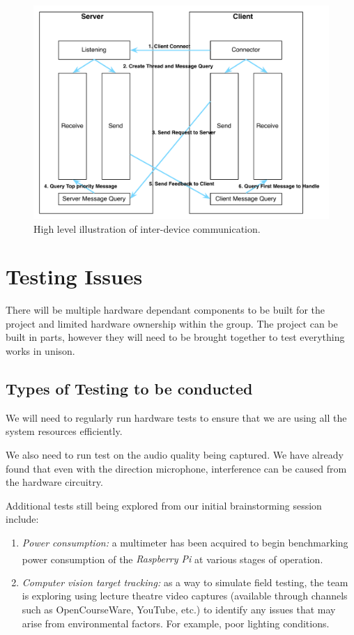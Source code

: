 \documentclass[11pt,a4paper,titlepage]{report}
\newcommand{\rpi}{\textit{Raspberry Pi\textsuperscript{\textregistered}}}
\begin{document}
\begin{figure}
\centering
\includegraphics[width=1.0\textwidth]{graphs/comm.pdf}
\caption{High level illustration of inter-device communication.}
\label{fig:comm}
\end{figure}


\section{Testing Issues}

There will be multiple hardware dependant components to be built for the project and limited hardware ownership within the group. The project can be built in parts, however they will need to be brought together to test everything works in unison.

\subsection{Types of Testing to be conducted}

We will need to regularly run hardware tests to ensure that we are using all the system resources efficiently.

We also need to run test on the audio quality being captured. We have already found that even with the direction microphone, interference can be caused from the hardware circuitry. 

Additional tests still being explored from our initial brainstorming session include:

\begin{enumerate}
  \item \textit{Power consumption:} a multimeter has been acquired to begin benchmarking power consumption of the \rpi\xspace at various stages of operation.
  \item \textit{Computer vision target tracking:} as a way to simulate field testing, the team is exploring using lecture theatre video captures (available through channels such as OpenCourseWare, YouTube, etc.) to identify any issues that may arise from environmental factors. For example, poor lighting conditions.

\end{enumerate}
\end{document}
